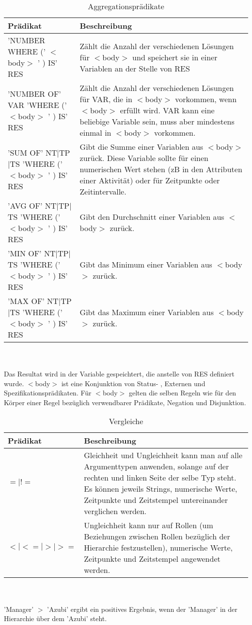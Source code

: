 \begin{table}[h]
\begin{tabular} {|p{6cm}|p{10cm}|}
\hline
\textbf{Prädikat} & \textbf{Beschreibung}\\
\hline
'NUMBER WHERE (' $<$body$>$ ' ) IS' RES		& Zählt die Anzahl der verschiedenen Lösungen für $<$body$>$ und speichert sie in einer Variablen an der Stelle von RES \\
\hline
'NUMBER OF' VAR 'WHERE (' $<$body$>$ ' ) IS' RES	& Zählt die Anzahl der verschiedenen Lösungen für VAR, die in $<$body$>$ vorkommen, wenn $<$body$>$ erfüllt wird. VAR kann eine beliebige Variable sein, muss aber mindestens einmal in $<$body$>$ vorkommen.\\
\hline
'SUM OF' NT$|$TP$|$TS 'WHERE (' $<$body$>$ ' ) IS' RES		& Gibt die Summe einer Variablen aus $<$body$>$ zurück. Diese Variable sollte für einen numerischen Wert stehen (zB in den Attributen einer Aktivität) oder für Zeitpunkte oder Zeitintervalle.\\
\hline
'AVG OF' NT$|$TP$|$TS 'WHERE (' $<$body$>$ ' ) IS' RES		& Gibt den Durchschnitt einer Variablen aus $<$body$>$ zurück.\\
\hline
'MIN OF' NT$|$TP$|$TS 'WHERE (' $<$body$>$ ' ) IS' RES		& Gibt das Minimum einer Variablen aus $<$body$>$ zurück.\\
\hline
'MAX OF' NT$|$TP$|$TS 'WHERE (' $<$body$>$ ' ) IS' RES		& Gibt das Maximum einer Variablen aus $<$body$>$ zurück.\\
\hline
\end{tabular}
\\\\\small Das Resultat wird in der Variable gespeichtert, die anstelle von RES definiert wurde. $<$body$>$ ist eine Konjunktion von Status- , Externen und Spezifikationsprädikaten. Für $<$body$>$ gelten die selben Regeln wie für den Körper einer Regel bezüglich verwendbarer Prädikate, Negation und Disjunktion. 
\caption{Aggregationsprädikate}
\label{tab:conditional}
\end{table}

\begin{table}[h]
\begin{tabular} {|p{6cm}|p{10cm}|}
\hline
\textbf{Prädikat} & \textbf{Beschreibung}\\
\hline
 $= | !=$		& Gleichheit und Ungleichheit kann man auf alle Argumenttypen anwenden, solange auf der rechten und linken Seite der selbe Typ steht. Es können jeweils Strings, numerische Werte, Zeitpunkte und Zeitstempel untereinander verglichen werden. \\
\hline
 $< | <= | > | >=$   	& Ungleichheit kann nur auf Rollen (um Beziehungen zwischen Rollen bezüglich der Hierarchie festzustellen), numerische Werte, Zeitpunkte und Zeitstempel angewendet werden. \\
\hline
\end{tabular}
\\\\\small 'Manager' $>$ 'Azubi' ergibt ein positives Ergebnis, wenn der 'Manager' in der Hierarchie über dem 'Azubi' steht.
\caption{Vergleiche}
\label{tab:comparison}
\end{table}

